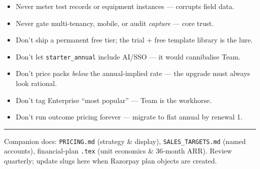 \documentclass[11pt,a4paper]{article}
\newcommand{\plan}[1]{\texttt{\textcolor{accent}{#1}}}
\begin{document}
\begin{itemize}[noitemsep, leftmargin=1.4em]
  \item Never meter test records or equipment instances --- corrupts field data.
  \item Never gate multi-tenancy, mobile, or audit \emph{capture} --- core trust.
  \item Don't ship a permanent free tier; the trial + free template library is the lure.
  \item Don't let \plan{starter\_annual} include AI/SSO --- it would cannibalise Team.
  \item Don't price packs \emph{below} the annual-implied rate --- the upgrade must always look rational.
  \item Don't tag Enterprise ``most popular'' --- Team is the workhorse.
  \item Don't run outcome pricing forever --- migrate to flat annual by renewal 1.
\end{itemize}

\vspace{1em}
\hrule
\vspace{0.5em}
\noindent\textcolor{mgrey}{\small Companion docs: \texttt{PRICING.md} (strategy \&
display), \texttt{SALES\_TARGETS.md} (named accounts), financial-plan \texttt{.tex}
(unit economics \& 36-month ARR). Review quarterly; update slugs here when Razorpay
plan objects are created.}
\end{document}

